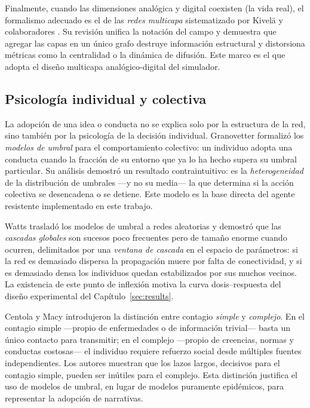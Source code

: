 \documentclass[12pt]{extarticle}
\numberwithin{equation}{section}
\begin{document}
Finalmente, cuando las dimensiones anal\'ogica y digital coexisten (la vida real), el formalismo adecuado es el de las \emph{redes multicapa} sistematizado por Kivel\"a y colaboradores \cite{Kivela2014}. Su revisi\'on unifica la notaci\'on del campo y demuestra que agregar las capas en un \'unico grafo destruye informaci\'on estructural y distorsiona m\'etricas como la centralidad o la din\'amica de difusi\'on. Este marco es el que adopta el dise\~no multicapa anal\'ogico-digital del simulador.

\subsection{Psicología individual y colectiva}

La adopci\'on de una idea o conducta no se explica solo por la estructura de la red, sino tambi\'en por la psicolog\'ia de la decisi\'on individual. Granovetter \cite{Granovetter1978} formaliz\'o los \emph{modelos de umbral} para el comportamiento colectivo: un individuo adopta una conducta cuando la fracci\'on de su entorno que ya lo ha hecho supera su umbral particular. Su an\'alisis demostr\'o un resultado contraintuitivo: es la \emph{heterogeneidad} de la distribuci\'on de umbrales —y no su media— la que determina si la acci\'on colectiva se desencadena o se detiene. Este modelo es la base directa del agente resistente implementado en este trabajo.

Watts \cite{Watts2002} traslad\'o los modelos de umbral a redes aleatorias y demostr\'o que las \emph{cascadas globales} son sucesos poco frecuentes pero de tama\~no enorme cuando ocurren, delimitados por una \emph{ventana de cascada} en el espacio de par\'ametros: si la red es demasiado dispersa la propagaci\'on muere por falta de conectividad, y si es demasiado densa los individuos quedan estabilizados por sus muchos vecinos. La existencia de este punto de inflexi\'on motiva la curva dosis--respuesta del dise\~no experimental del Cap\'itulo~\ref{sec:results}.

Centola y Macy \cite{CentolaMacy2007} introdujeron la distinci\'on entre contagio \emph{simple} y \emph{complejo}. En el contagio simple —propio de enfermedades o de informaci\'on trivial— basta un \'unico contacto para transmitir; en el complejo —propio de creencias, normas y conductas costosas— el individuo requiere refuerzo social desde m\'ultiples fuentes independientes. Los autores muestran que los lazos largos, decisivos para el contagio simple, pueden ser in\'utiles para el complejo. Esta distinci\'on justifica el uso de modelos de umbral, en lugar de modelos puramente epid\'emicos, para representar la adopci\'on de narrativas.
\end{document}
